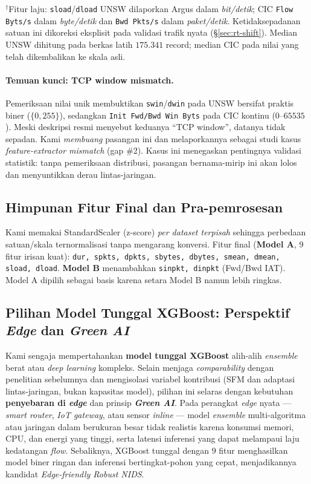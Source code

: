 \documentclass[11pt,a4paper]{article}
\begin{document}
\begin{table}[t]
\vspace{0.4em}
\raggedright{\footnotesize $^\dagger$Fitur laju: \texttt{sload}/\texttt{dload}
UNSW dilaporkan Argus dalam \emph{bit/detik}; CIC \texttt{Flow Byts/s} dalam
\emph{byte/detik} dan \texttt{Bwd Pkts/s} dalam \emph{paket/detik}.
Ketidaksepadanan satuan ini dikoreksi eksplisit pada validasi trafik nyata
(\S\ref{sec:rt-shift}). Median UNSW dihitung pada berkas latih $175{.}341$ record;
median CIC pada nilai yang telah dikembalikan ke skala asli.}
\end{table}

\paragraph{Temuan kunci: TCP window mismatch.} Pemeriksaan nilai unik
membuktikan \texttt{swin}/\texttt{dwin} pada UNSW bersifat praktis biner
($\{0, 255\}$), sedangkan \texttt{Init Fwd/Bwd Win Byts} pada CIC kontinu
($0$--$65535$). Meski deskripsi resmi menyebut keduanya ``TCP window'', datanya
tidak sepadan. Kami \emph{membuang} pasangan ini dan melaporkannya sebagai studi
kasus \emph{feature-extractor mismatch} (gap \#2). Kasus ini menegaskan pentingnya
validasi statistik: tanpa pemeriksaan distribusi, pasangan bernama-mirip ini akan
lolos dan menyuntikkan derau lintas-jaringan.

\subsection{Himpunan Fitur Final dan Pra-pemrosesan}
Kami memakai StandardScaler (z-score) \emph{per dataset terpisah} sehingga
perbedaan satuan/skala ternormalisasi tanpa mengarang konversi. Fitur final
(\textbf{Model A}, 9 fitur irisan kuat): \texttt{dur, spkts, dpkts, sbytes,
dbytes, smean, dmean, sload, dload}. \textbf{Model B} menambahkan
\texttt{sinpkt, dinpkt} (Fwd/Bwd IAT). Model A dipilih sebagai basis karena
setara Model B namun lebih ringkas.

\subsection{Pilihan Model Tunggal XGBoost: Perspektif \emph{Edge} dan \emph{Green AI}}
\label{sec:edge}
Kami sengaja mempertahankan \textbf{model tunggal XGBoost} alih-alih
\emph{ensemble} berat atau \emph{deep learning} kompleks. Selain menjaga
\emph{comparability} dengan penelitian sebelumnya dan mengisolasi variabel
kontribusi (SFM dan adaptasi lintas-jaringan, bukan kapasitas model), pilihan ini
selaras dengan kebutuhan \textbf{penyebaran di \emph{edge}} dan prinsip
\textbf{\emph{Green AI}}. Pada perangkat \emph{edge} nyata --- \emph{smart router},
\emph{IoT gateway}, atau sensor \emph{inline} --- model \emph{ensemble} multi-algoritma
atau jaringan dalam berukuran besar tidak realistis karena konsumsi memori, CPU,
dan energi yang tinggi, serta latensi inferensi yang dapat melampaui laju
kedatangan \emph{flow}. Sebaliknya, XGBoost tunggal dengan $9$ fitur menghasilkan
model biner ringan dan inferensi bertingkat-pohon yang cepat, menjadikannya
kandidat \emph{Edge-friendly Robust NIDS}.
\end{document}
